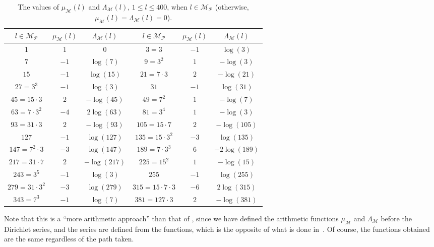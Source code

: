 \documentclass[11pt, a4paper]{article}
\newcommand{\calM}{\mathcal{M}}
\newcommand{\manM}{\Lambda_{\calM}}
\newcommand{\muM}{\mu_\calM}
\newcommand{\Mp}{\calM_{\mathcal{P}}}
\theoremstyle{plain}
\theoremstyle{definition}
\begin{document}
\begin{table}
\centering
\begin{tabular}{ccc@{\qquad\quad}ccc}
\hline
$l \in \Mp$ & $\muM(l)$ & $\manM(l)$
& $l \in \Mp$ & $\muM(l)$ & $\manM(l)$
\\
\hline
1 & $1$ & $0$
& $3 = 3$ & $-1$ & $\log (3)$
\\
$7$ & $-1$ & $\log (7)$
& $9 = 3^2$ & $1$ & $-\log (3)$
\\
$15$ & $-1$ & $\log (15)$
& $21 = 7\cdot 3$ & $2$ & $-\log (21)$
\\
$27 = 3^3$ & $-1$ & $\log (3)$
& $31$ & $-1$ & $\log (31)$
\\
$45 = 15\cdot 3$ & $2$ & $-\log (45)$
& $49 = 7^2$ & $1$ & $-\log (7)$
\\
$63 = 7\cdot 3^2$ & $-4$ & $2\log (63)$ %
& $81 = 3^4$ & $1$ & $-\log (3)$
\\
$93 = 31\cdot 3$ & $2$ & $-\log (93)$
& $105 = 15\cdot 7$ & $2$ & $-\log (105)$
\\
$127$ & $-1$ & $\log (127)$
& $135 = 15\cdot 3^2$ & $-3$ & $\log (135)$
\\
$147 = 7^2\cdot 3$ & $-3$ & $\log (147)$
& $189 = 7\cdot 3^3$ & $6$ & $-2 \log (189)$
\\
$217 = 31\cdot 7$ & $2$ & $-\log (217)$
& $225 = 15^2$ & $1$ & $-\log (15)$
\\
$243 = 3^5$ & $-1$ & $\log (3)$
& $255$ & $-1$ & $\log (255)$
\\
$279 = 31\cdot 3^2$ & $-3$ & $\log (279)$
& $315 = 15\cdot 7\cdot 3$ & $-6$ & $2\log (315)$ %
\\
$343 = 7^3$ & $-1$ & $\log (7)$
& $381 = 127\cdot 3$ & $2$ & $-\log (381)$
\\
\hline
\end{tabular}
\caption{The values of $\muM(l)$ and $\manM(l)$, $1 \le l \le 400$, when $l \in \Mp$ 
(otherwise, $\muM(l)=\manM(l)=0$).}
\label{table:mumanM}
\end{table}

Note that this is a ``more arithmetic approach'' than that of \cite{MoNaVa}, since we have defined the arithmetic functions $\muM$ and $\manM$ before the Dirichlet series, and the series are defined from the functions, which is the opposite of what is done in~\cite{MoNaVa}. Of course, the functions obtained are the same regardless of the path taken.
\end{document}
